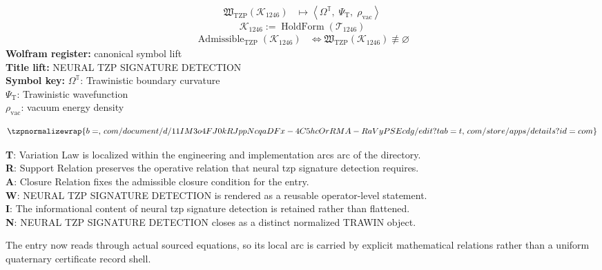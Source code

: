 \noindent
\begin{minipage}[t]{0.48\linewidth}
\begingroup
\small
\[
\begin{aligned}
\mathfrak{W}_{\mathrm{TZP}}\!\left(\mathcal{K}_{1246}\right)
&\longmapsto
\left\langle \Omega^{\mathbb{T}},\; \Psi_{\mathrm{T}},\; \rho_{\mathrm{vac}} \right\rangle
\end{aligned}
\]
\[
\mathcal{K}_{1246}
:=
\operatorname{HoldForm}\!\left(\mathcal{T}_{1246}\right)
\]
\[
\begin{aligned}
\operatorname{Admissible}_{\mathrm{TZP}}\!\left(\mathcal{K}_{1246}\right)
&\Longleftrightarrow
\mathfrak{W}_{\mathrm{TZP}}\!\left(\mathcal{K}_{1246}\right)\not\equiv\varnothing
\end{aligned}
\]
\textbf{Wolfram register:} canonical symbol lift\\
\textbf{Title lift:} NEURAL TZP SIGNATURE DETECTION\\
\textbf{Symbol key:} \(\Omega^{\mathbb{T}}\): Trawinistic boundary curvature\\ \(\Psi_{\mathrm{T}}\): Trawinistic wavefunction\\ \(\rho_{\mathrm{vac}}\): vacuum energy density
\par
\endgroup
\end{minipage}\hfill
\begin{minipage}[t]{0.48\linewidth}
\[
\tzpnormalizewrap{b =,\,com/document/d/11IM3o4FJ0kRJppNcqaDFx-4C5hcOrRMA-RaVyPSEcdg/edit?tab=t,\,com/store/apps/details?id=com}
\]

\small
\textbf{T}: Variation Law is localized within the engineering and implementation arcs arc of the directory.\\
\textbf{R}: Support Relation preserves the operative relation that neural tzp signature detection requires.\\
\textbf{A}: Closure Relation fixes the admissible closure condition for the entry.\\
\textbf{W}: NEURAL TZP SIGNATURE DETECTION is rendered as a reusable operator-level statement.\\
\textbf{I}: The informational content of neural tzp signature detection is retained rather than flattened.\\
\textbf{N}: NEURAL TZP SIGNATURE DETECTION closes as a distinct normalized TRAWIN object.
\normalsize
\end{minipage}

The entry now reads through actual sourced equations, so its local arc is carried by explicit mathematical relations rather than a uniform quaternary certificate record shell.
\clearpage

